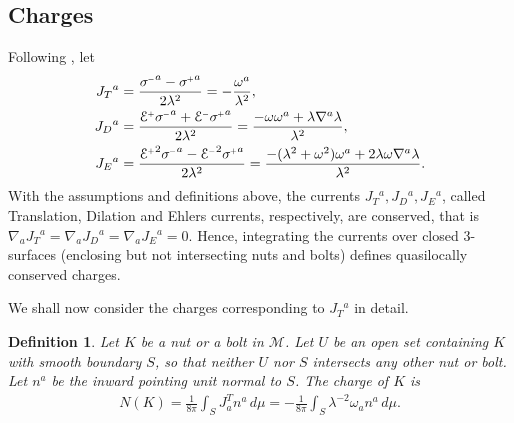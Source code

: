 \documentclass[a4paper,10pt,reqno]{amsart}
\newcommand{\cM}{\mathcal{M}}
\theoremstyle{plain}
\newtheorem{definition}[thm]{Definition}
\renewcommand{\P}[1]{{{#1}^{\hspace{-.5pt}\scaleto{+}{4pt}}}}
\newcommand{\M}[1]{{{#1}^{\hspace{-.5pt}\scaleto{-}{4pt}}}}
\def\Ecal{\mathcal{E}}
\numberwithin{equation}{section}
\begin{document}
\subsection{Charges} 
Following \cite[\S 5]{gibbons:hawking:1979}, let 
\begin{subequations}\label{eq:currents}
\begin{align}
J_{T}{}^{a}={}&\frac{\M{\sigma}^{a} -  \P{\sigma}^{a}}{2 \lambda^2} = - \frac{\omega^a}{\lambda^2}, \label{eq:JT-def} \\
J_{D}{}^{a}={}&\frac{\P{\Ecal} \M{\sigma}^{a} + \M{\Ecal} \P{\sigma}^{a}}{2 \lambda^2} = \frac{-\omega \omega^a + \lambda \nabla^a\lambda}{\lambda^2},\\
J_{E}{}^{a}={}&\frac{\P{\Ecal}^2 \M{\sigma}^{a} -  \M{\Ecal}^2 \P{\sigma}^{a}}{2 \lambda^2} = \frac{-(\lambda^2 + \omega^2)\omega^a + 2\lambda\omega\nabla^a\lambda}{\lambda^2} .
\end{align}
\end{subequations}
With the assumptions and definitions above, the currents $J_{T}{}^{a}, J_{D}{}^{a}, J_{E}{}^{a}$, called Translation, Dilation and Ehlers currents, respectively, are conserved, that is $\nabla_a J_{T}{}^{a} = \nabla_a J_{D}{}^{a} = \nabla_a J_{E}{}^{a} = 0$. Hence, integrating the currents over closed 3-surfaces  (enclosing but not intersecting nuts and bolts) defines quasilocally conserved charges.  

We shall now consider the charges corresponding to $J_T{}^a$ in detail.

\begin{definition}
Let $K$ be a nut or a bolt in $\cM$. Let $U$ be an open set containing $K$ with smooth boundary $S$, so that neither $U$ nor $S$ intersects any other nut or bolt. Let $n^a$ be the inward pointing unit normal to $S$. The charge of $K$ is 
\begin{align}
N(K) = \frac{1}{8\pi} \int_S J^T _a n^a \, d\mu
= -\frac{1}{8\pi} \int_S \lambda^{-2} \omega_a n^a \, d\mu.
\end{align}
%
%
\end{definition} 
\end{document}
